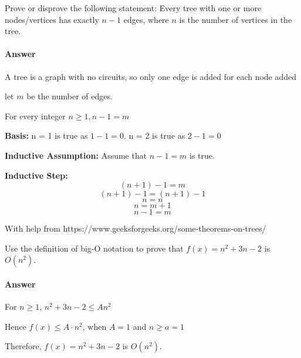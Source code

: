 \documentclass{article}
\begin{document}
\collab{}

Prove or disprove the following statement: Every tree with one or more
nodes/vertices has exactly $n-1$ edges, where $n$ is the number of vertices in
the tree.

\paragraph{Answer}

A tree is a graph with no circuits, so only one edge is added for each node added

let $m$ be the number of edges.

For every integer $n \geq 1, n - 1 = m$

{\bf Basis:} n = 1 is true as $1 - 1 = 0$. n = 2 is true as $2-1=0$

{\bf Inductive Assumption:} Assume that $n - 1 = m$ is true.

    {\bf Inductive Step:} $$(n+1) -1 = m $$
$$(n+1) -1 = (n +1) - 1$$
$$n=n$$
$$n=m +1$$
$$n-1=m$$

With help from https://www.geeksforgeeks.org/some-theorems-on-trees/


\collab{}

Use the definition of big-O notation to prove that $f(x)=n^2 + 3n -2$ is
$O(n^2)$.

\paragraph{Answer}

For $n \ge 1$, $ n^2 + 3n -2 \leq A n^2$

Hence $f(x) \leq A \cdot n^2$, when $A = 1$ and $n \geq a = 1$

Therefore, $f(x)=n^2 + 3n -2$ is $O(n^2)$.
\end{document}
